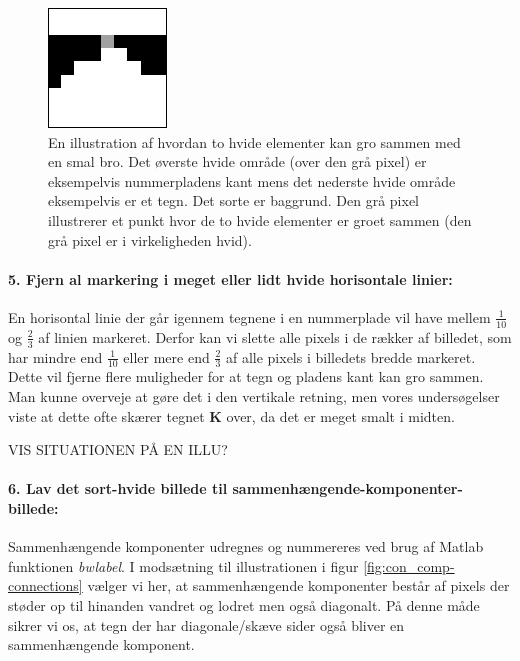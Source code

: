 \begin{figure}[htp]
\centering
\includegraphics{implementation/illu/cc_remove_thin_line.png} 
\caption{En illustration af hvordan to hvide elementer kan gro sammen med en smal bro. Det øverste hvide område (over den grå pixel) er eksempelvis nummerpladens kant mens det nederste hvide område eksempelvis er et tegn. Det sorte er baggrund. Den grå pixel illustrerer et punkt hvor de to hvide elementer er groet sammen (den grå pixel er i virkeligheden hvid).}
\label{fig:tynd_linie}
\end{figure}

\paragraph{5. Fjern al markering i meget eller lidt hvide horisontale linier:} En horisontal linie der går igennem tegnene i en nummerplade vil have mellem $\frac{1}{10}$ og $\frac{2}{3}$ af linien markeret. Derfor kan vi slette alle pixels i de rækker af billedet, som har mindre end $\frac{1}{10}$ eller mere end $\frac{2}{3}$ af alle pixels i billedets bredde markeret. Dette vil fjerne flere muligheder for at tegn og pladens kant kan gro sammen. Man kunne overveje at gøre det i den vertikale retning, men vores undersøgelser viste at dette ofte skærer tegnet \textbf{K} over, da det er meget smalt i midten.

VIS SITUATIONEN PÅ EN ILLU?

\paragraph{6. Lav det sort-hvide billede til sammenhængende-komponenter-billede:} Sammenhængende komponenter udregnes og nummereres ved brug af Matlab funktionen \textit{bwlabel}. I modsætning til illustrationen i figur \vref{fig:con_comp-connections} vælger vi her, at sammenhængende komponenter består af pixels der støder op til hinanden vandret og lodret men også diagonalt. På denne måde sikrer vi os, at tegn der har diagonale/skæve sider også bliver en sammenhængende komponent.

